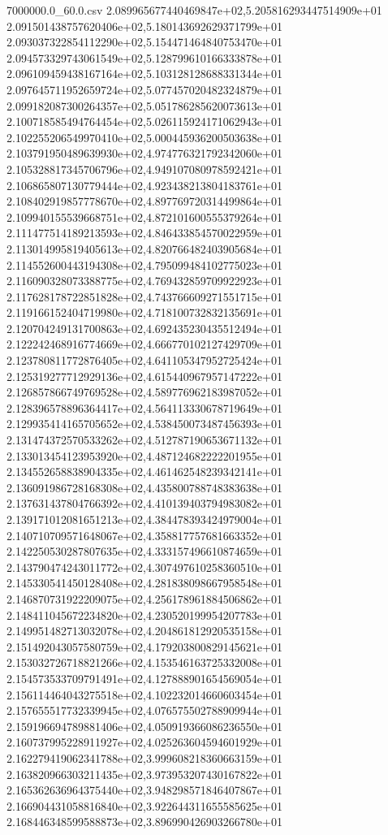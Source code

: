 \begin{filecontents*}{7000000.0_60.0.csv}
2.089965677440469847e+02,5.205816293447514909e+01
2.091501438757620406e+02,5.180143692629371799e+01
2.093037322854112290e+02,5.154471464840753470e+01
2.094573329743061549e+02,5.128799610166333878e+01
2.096109459438167164e+02,5.103128128688331344e+01
2.097645711952659724e+02,5.077457020482324879e+01
2.099182087300264357e+02,5.051786285620073613e+01
2.100718585494764454e+02,5.026115924171062943e+01
2.102255206549970410e+02,5.000445936200503638e+01
2.103791950489639930e+02,4.974776321792342060e+01
2.105328817345706796e+02,4.949107080978592421e+01
2.106865807130779444e+02,4.923438213804183761e+01
2.108402919857778670e+02,4.897769720314499864e+01
2.109940155539668751e+02,4.872101600555379264e+01
2.111477514189213593e+02,4.846433854570022959e+01
2.113014995819405613e+02,4.820766482403905684e+01
2.114552600443194308e+02,4.795099484102775023e+01
2.116090328073388775e+02,4.769432859709922923e+01
2.117628178722851828e+02,4.743766609271551715e+01
2.119166152404719980e+02,4.718100732832135691e+01
2.120704249131700863e+02,4.692435230435512494e+01
2.122242468916774669e+02,4.666770102127429709e+01
2.123780811772876405e+02,4.641105347952725424e+01
2.125319277712929136e+02,4.615440967957147222e+01
2.126857866749769528e+02,4.589776962183987052e+01
2.128396578896364417e+02,4.564113330678719649e+01
2.129935414165705652e+02,4.538450073487456393e+01
2.131474372570533262e+02,4.512787190653671132e+01
2.133013454123953920e+02,4.487124682222201955e+01
2.134552658838904335e+02,4.461462548239342141e+01
2.136091986728168308e+02,4.435800788748383638e+01
2.137631437804766392e+02,4.410139403794983082e+01
2.139171012081651213e+02,4.384478393424979004e+01
2.140710709571648067e+02,4.358817757681663352e+01
2.142250530287807635e+02,4.333157496610874659e+01
2.143790474243011772e+02,4.307497610258360510e+01
2.145330541450128408e+02,4.281838098667958548e+01
2.146870731922209075e+02,4.256178961884506862e+01
2.148411045672234820e+02,4.230520199954207783e+01
2.149951482713032078e+02,4.204861812920535158e+01
2.151492043057580759e+02,4.179203800829145621e+01
2.153032726718821266e+02,4.153546163725332008e+01
2.154573533709791491e+02,4.127888901654569054e+01
2.156114464043275518e+02,4.102232014660603454e+01
2.157655517732339945e+02,4.076575502788909944e+01
2.159196694789881406e+02,4.050919366086236550e+01
2.160737995228911927e+02,4.025263604594601929e+01
2.162279419062341788e+02,3.999608218360663159e+01
2.163820966303211435e+02,3.973953207430167822e+01
2.165362636964375440e+02,3.948298571846407867e+01
2.166904431058816840e+02,3.922644311655585625e+01
2.168446348599588873e+02,3.896990426903266780e+01

\end{filecontents*}

